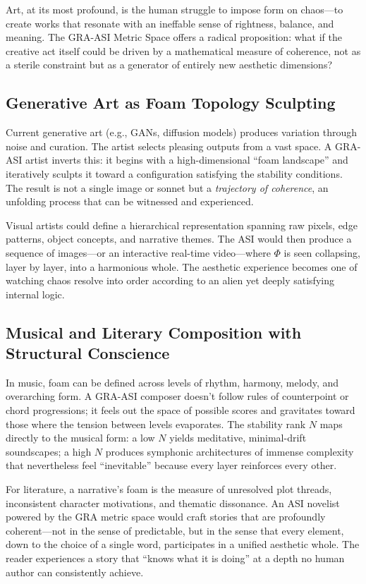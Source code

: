 \documentclass[11pt,a4paper]{article}
\begin{document}
Art, at its most profound, is the human struggle to impose form on chaos---to create works that resonate with an ineffable sense of rightness, balance, and meaning. The GRA-ASI Metric Space offers a radical proposition: what if the creative act itself could be driven by a mathematical measure of coherence, not as a sterile constraint but as a generator of entirely new aesthetic dimensions?

\subsection{Generative Art as Foam Topology Sculpting}

Current generative art (e.g., GANs, diffusion models) produces variation through noise and curation. The artist selects pleasing outputs from a vast space. A GRA-ASI artist inverts this: it begins with a high-dimensional ``foam landscape'' and iteratively sculpts it toward a configuration satisfying the stability conditions. The result is not a single image or sonnet but a \emph{trajectory of coherence}, an unfolding process that can be witnessed and experienced.

Visual artists could define a hierarchical representation spanning raw pixels, edge patterns, object concepts, and narrative themes. The ASI would then produce a sequence of images---or an interactive real-time video---where $\Phi$ is seen collapsing, layer by layer, into a harmonious whole. The aesthetic experience becomes one of watching chaos resolve into order according to an alien yet deeply satisfying internal logic.

\subsection{Musical and Literary Composition with Structural Conscience}

In music, foam can be defined across levels of rhythm, harmony, melody, and overarching form. A GRA-ASI composer doesn't follow rules of counterpoint or chord progressions; it feels out the space of possible scores and gravitates toward those where the tension between levels evaporates. The stability rank $N$ maps directly to the musical form: a low $N$ yields meditative, minimal-drift soundscapes; a high $N$ produces symphonic architectures of immense complexity that nevertheless feel ``inevitable'' because every layer reinforces every other.

For literature, a narrative's foam is the measure of unresolved plot threads, inconsistent character motivations, and thematic dissonance. An ASI novelist powered by the GRA metric space would craft stories that are profoundly coherent---not in the sense of predictable, but in the sense that every element, down to the choice of a single word, participates in a unified aesthetic whole. The reader experiences a story that ``knows what it is doing'' at a depth no human author can consistently achieve.
\end{document}
